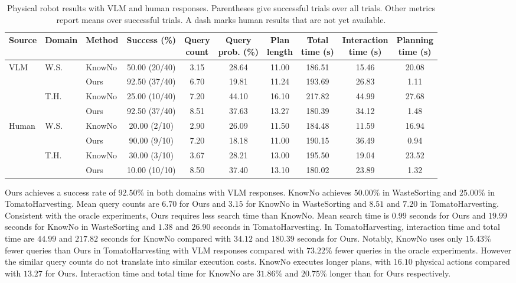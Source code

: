 \begin{table}[t]
\centering
\caption{Physical robot results with VLM and human responses. Parentheses give successful trials over all trials. Other metrics report means over successful trials. A dash marks human results that are not yet available.}
\label{tab:physical_robot_results}
\small
\setlength{\tabcolsep}{2.5pt}
\begin{tabular*}{\textwidth}{@{\extracolsep{\fill}}lllccccccc}
\toprule
Source & Domain & Method & Success (\%) & \shortstack{Query\\count} & \shortstack{Query\\prob. (\%)} & \shortstack{Plan\\length} & \shortstack{Total\\time (s)} & \shortstack{Interaction\\time (s)} & \shortstack{Planning\\time (s)} \\
\midrule
VLM & W.S. & KnowNo & 50.00 (20/40) & 3.15 & 28.64 & 11.00 & 186.51 & 15.46 & 20.08 \\
 &  & Ours & 92.50 (37/40) & 6.70 & 19.81 & 11.24 & 193.69 & 26.83 & 1.11 \\
\addlinespace
 & T.H. & KnowNo & 25.00 (10/40) & 7.20 & 44.10 & 16.10 & 217.82 & 44.99 & 27.68 \\
 &  & Ours & 92.50 (37/40) & 8.51 & 37.63 & 13.27 & 180.39 & 34.12 & 1.48 \\
\midrule
Human & W.S. & KnowNo & 20.00 (2/10) & 2.90 & 26.09 & 11.50 & 184.48 & 11.59 & 16.94 \\
 &  & Ours & 90.00 (9/10) & 7.20 & 18.18 & 11.00 & 190.15 & 36.49 & 0.94 \\
\addlinespace
 & T.H. & KnowNo & 30.00 (3/10) & 3.67 & 28.21 & 13.00 & 195.50 & 19.04 & 23.52 \\
 &  & Ours & 10.00 (10/10) & 8.50 & 37.40 & 13.10 & 180.02 & 23.89 & 1.32 \\
\bottomrule
\end{tabular*}
\end{table}

Ours achieves a success rate of $92.50\%$ in both domains with VLM responses. KnowNo achieves $50.00\%$ in WasteSorting and $25.00\%$ in TomatoHarvesting. Mean query counts are $6.70$ for Ours and $3.15$ for KnowNo in WasteSorting and $8.51$ and $7.20$ in TomatoHarvesting. Consistent with the oracle experiments, Ours requires less search time than KnowNo. Mean search time is $0.99$ seconds for Ours and $19.99$ seconds for KnowNo in WasteSorting and $1.38$ and $26.90$ seconds in TomatoHarvesting. In TomatoHarvesting, interaction time and total time are $44.99$ and $217.82$ seconds for KnowNo compared with $34.12$ and $180.39$ seconds for Ours. Notably, KnowNo uses only $15.43\%$ fewer queries than Ours in TomatoHarvesting with VLM responses compared with $73.22\%$ fewer queries in the oracle experiments. However the similar query counts do not translate into similar execution costs. KnowNo executes longer plans, with $16.10$ physical actions compared with $13.27$ for Ours. Interaction time and total time for KnowNo are $31.86\%$ and $20.75\%$ longer than for Ours respectively.

